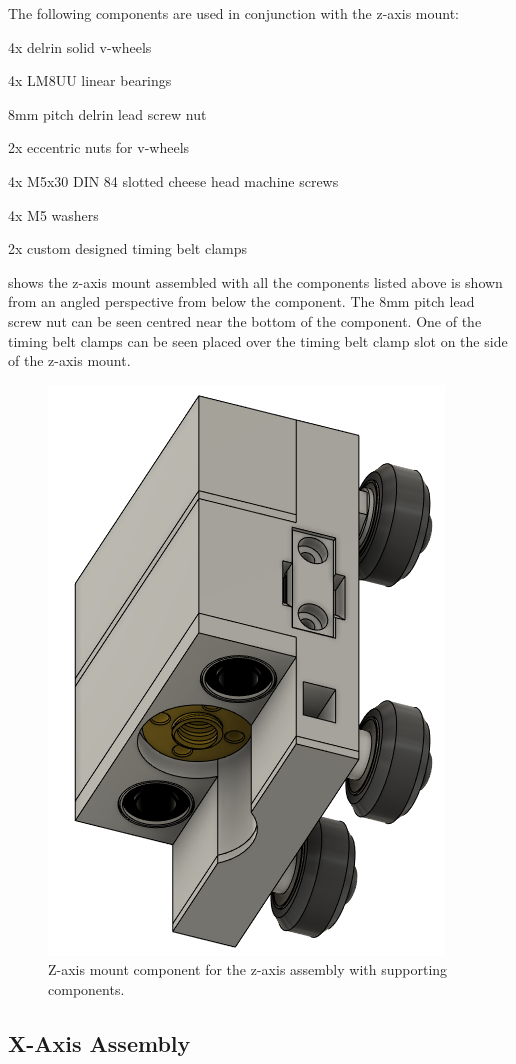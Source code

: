 The following components are used in conjunction with the z-axis mount:

\begin{compactitem}
	\item 4x delrin solid v-wheels
	\item 4x LM8UU linear bearings
	\item 8mm pitch delrin lead screw nut
	\item 2x eccentric nuts for v-wheels
	\item 4x M5x30 DIN 84 slotted cheese head machine screws
	\item 4x M5 washers
	\item 2x custom designed timing belt clamps
\end{compactitem}

 shows the z-axis mount assembled with all the components listed above is shown from an angled perspective from below the component. The 8mm pitch lead screw nut can be seen centred near the bottom of the component. One of the timing belt clamps can be seen placed over the timing belt clamp slot on the side of the z-axis mount.

\begin{figure}[H]
	\centering
	\includegraphics[width=0.3\linewidth]{figures/202108/z-axis-mount-assembled.png}
	\caption{Z-axis mount component for the z-axis assembly with supporting components.}
	\label{fig:z-axis-mount-assembled}
\end{figure}

\subsection{X-Axis Assembly}

